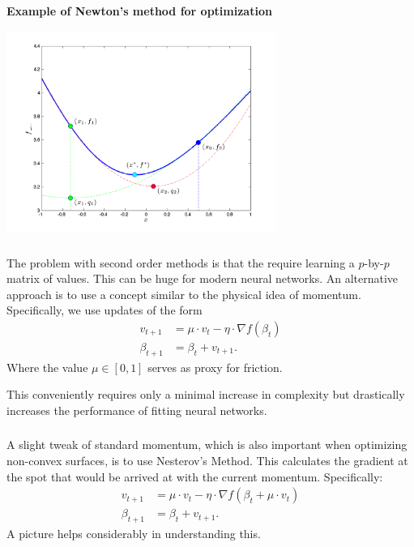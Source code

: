 \documentclass[xetex,mathserif,serif,aspectratio=169]{beamer}
\begin{document}
\begin{frame}[fragile] \frametitle{} \oldB \small

\textbf{Example of Newton's method for optimization}

\begin{center}
\includegraphics[width=0.66\textwidth]{img/cp_newton_conv.png}
\end{center}

\end{frame}

\begin{frame}[fragile] \frametitle{} \oldB \small

\textbf{}

The problem with second order methods is that the require learning
a $p$-by-$p$ matrix of values. This can be huge for modern neural
networks. An alternative approach is to use a concept similar to
the physical idea of momentum. Specifically, we use updates of
the form
\begin{align*}
v_{t+1} &= \mu \cdot v_{t} - \eta \cdot \nabla f(\beta_{t}) \\
\beta_{t+1} &= \beta_{t} + v_{t+1}.
\end{align*}
Where the value $\mu \in [0,1]$ serves as proxy for friction.

This conveniently requires only a minimal increase in complexity
but drastically increases the performance of fitting neural networks.

\end{frame}


\begin{frame}[fragile] \frametitle{} \oldB \small

\textbf{}

A slight tweak of standard momentum, which is also important
when optimizing non-convex surfaces, is to use Nesterov's Method.
This calculates the gradient at the spot that would be arrived
at with the current momentum. Specifically:
\begin{align*}
v_{t+1} &= \mu \cdot v_{t} - \eta \cdot \nabla f(\beta_t + \mu \cdot v_{t}) \\
\beta_{t+1} &= \beta_{t} + v_{t+1}.
\end{align*}
A picture helps considerably in understanding this.

\end{frame}
\end{document}
